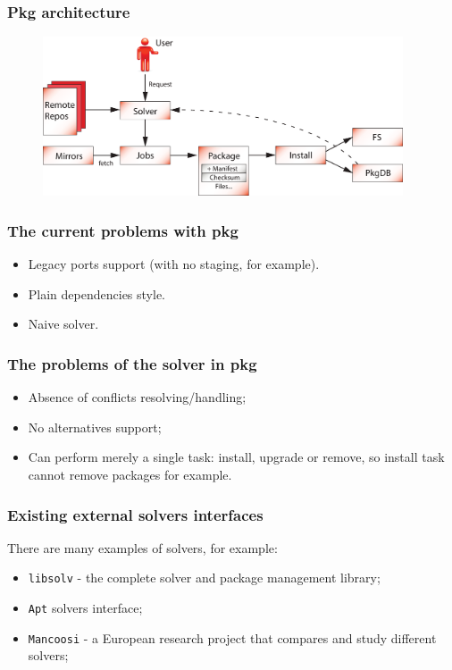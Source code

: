 \documentclass{beamer}
\begin{document}
\begin{frame}
\frametitle{Pkg architecture}
\begin{figure}[h!]
  \centering
  \includegraphics[width=0.95\textwidth]{q4.eps}
\end{figure}
\end{frame}

\begin{frame}
\frametitle{The current problems with pkg}
\begin{itemize}
  \item Legacy ports support (with no staging, for example).
  \item Plain dependencies style.
  \item Naive solver.
\end{itemize}
\end{frame}

\begin{frame}
\frametitle{The problems of the solver in pkg}

\begin{itemize}
\item Absence of conflicts resolving/handling;
\item No alternatives support;
\item Can perform merely a single task: install, upgrade or remove, 
so install task cannot remove packages for example.
\end{itemize}

\end{frame}


\begin{frame}
\frametitle{Existing external solvers interfaces}

There are many examples of solvers, for example:
\begin{itemize}
  \item \texttt{libsolv} - the complete solver and package management library;
  \item \texttt{Apt} solvers interface;
  \item \texttt{Mancoosi} - a European research project that compares and study
  different solvers;
\end{itemize}

\end{frame}
\end{document}
